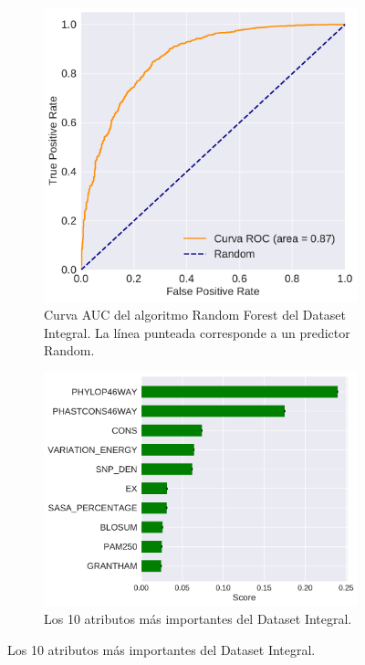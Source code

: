 \newpage
\begin{figure}[H]
\centering
\begin{subfigure}[b]{0.7\textwidth}
    \centering
    \includegraphics[width=\textwidth]{documents/latex/figures/3/integral_varq/auc_varq_integral.pdf}
    \caption{Curva AUC del algoritmo Random Forest del Dataset Integral. La línea punteada corresponde a un predictor Random.}
    \label{fig:auc_integral_varq}
\end{subfigure}
\hfill
\hfill
\begin{subfigure}[b]{0.7\textwidth}
    \centering
    \includegraphics[width=\textwidth]{documents/latex/figures/3/integral_varq/importances_varq_integral.pdf}
    \caption{Los 10 atributos más importantes del Dataset Integral.}
    \label{fig:importances_integral_varq}
\end{subfigure}
\end{figure}
